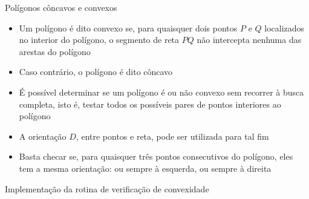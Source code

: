 \begin{frame}[fragile]{Polígonos côncavos e convexos}

    \begin{itemize}
        \item Um polígono é dito convexo se, para quaisquer dois pontos $P$ e $Q$ localizados no 
            interior do polígono, o segmento de reta $PQ$ não intercepta nenhuma das arestas do 
            polígono
        \pause

        \item Caso contrário, o polígono é dito côncavo
        \pause

        \item É possível determinar se um polígono é ou não convexo sem recorrer à busca completa,
            isto é, testar todos os possíveis pares de pontos interiores ao polígono
        \pause

        \item A orientação $D$, entre pontos e reta, pode ser utilizada para tal fim
        \pause

        \item Basta checar se, para quaisquer três pontos consecutivos do polígono, eles tem a 
            mesma orientação: ou sempre à esquerda, ou sempre à direita
    \end{itemize}

\end{frame}

\begin{frame}[fragile]{Implementação da rotina de verificação de convexidade}
\end{frame}
